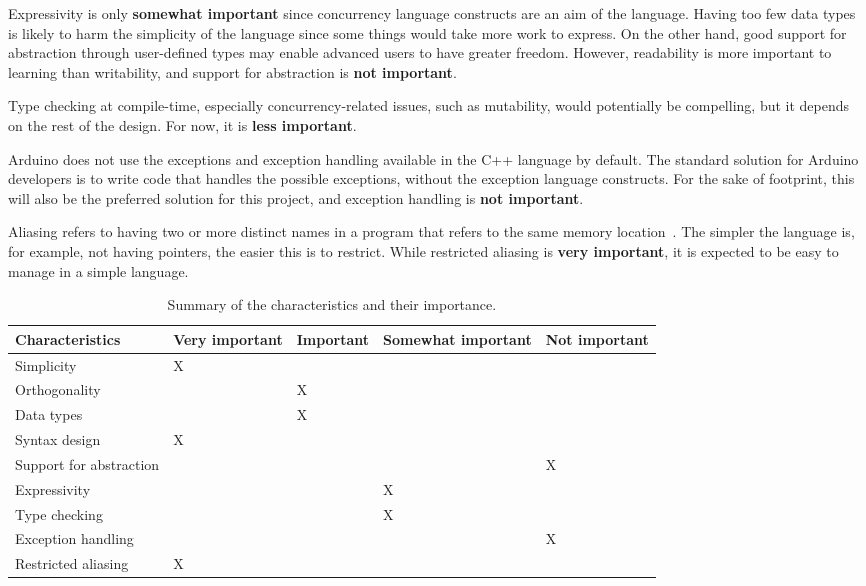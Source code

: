 Expressivity is only \textbf{somewhat important} since concurrency language constructs are an aim of the language. Having too few data types is likely to harm the simplicity of the language since some things would take more work to express. On the other hand, good support for abstraction through user-defined types may enable advanced users to have greater freedom. However, readability is more important to learning than writability, and support for abstraction is \textbf{not important}.

Type checking at compile-time, especially concurrency-related issues, such as mutability, would potentially be compelling, but it depends on the rest of the design. For now, it is \textbf{less important}.

Arduino does not use the exceptions and exception handling available in the C++ language by default. 
The standard solution for Arduino developers is to write code that handles the possible exceptions, without the exception language constructs. For the sake of footprint, this will also be the preferred solution for this project, and exception handling is \textbf{not important}.

Aliasing refers to having two or more distinct names in a program that refers to the same memory location~\cite{Sebesta2016}. The simpler the language is, for example, not having pointers, the easier this is to restrict. While restricted aliasing is \textbf{very important}, it is expected to be easy to manage in a simple language.


\begin{table}[htb]
    \centering
    \begin{tabular}{l>{\centering}p{2cm}>{\centering}p{2cm}>{\centering}p{2cm}>{\centering\arraybackslash}p{2cm}}
        \toprule
        \textbf{Characteristics}    &
        \textbf{Very important}     &
        \textbf{Important}          &
        \textbf{Somewhat important} &
        \textbf{Not important}                      \\ \midrule
        Simplicity                  & X &   &   &   \\
        Orthogonality               &   & X &   &   \\
        Data types                  &   & X &   &   \\
        Syntax design               & X &   &   &   \\
        Support for abstraction     &   &   &   & X \\
        Expressivity                &   &   & X &   \\
        Type checking               &   &   & X &   \\
        Exception handling          &   &   &   & X \\
        Restricted aliasing         & X &   &   &   \\
        \bottomrule
    \end{tabular}
    \caption{Summary of the characteristics and their importance.}
    \label{tab:priorityofcharacteristics}
\end{table}


